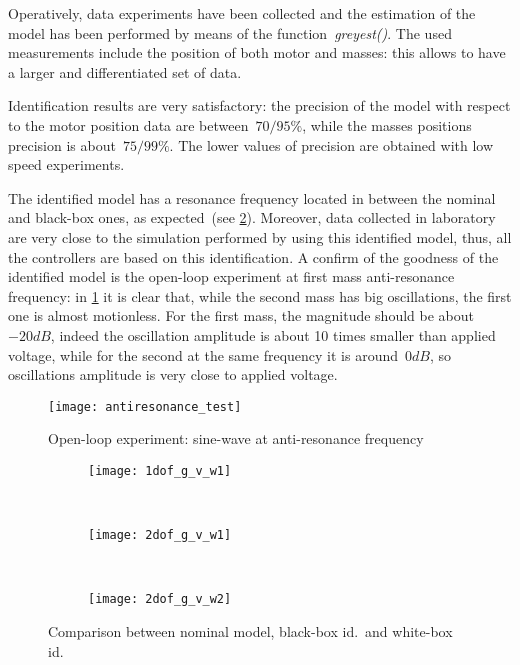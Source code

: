 Operatively, data experiments have been collected and the estimation of the model has been performed by means of the function~\textit{greyest()}. The used measurements include the position of both motor and masses: this allows to have a larger and differentiated set of data.

Identification results are very satisfactory: the precision of the model with respect to the motor position data are between~$70 / 95\%$, while the masses positions precision is about~$75 / 99\%$. The lower values of precision are obtained with low speed experiments.

The identified model has a resonance frequency located in between the nominal and black-box ones, as expected~(see \cref{fig:allModels_comparison}). Moreover, data collected in laboratory are very close to the simulation performed by using this identified model, thus, all the controllers are based on this identification. A confirm of the goodness of the identified model is the open-loop experiment at first mass anti-resonance frequency: in \cref{fig:antiresonance} it is clear that, while the second mass has big oscillations, the first one is almost motionless. For the first mass, the magnitude should be about~$-20 dB$, indeed the oscillation amplitude is about 10 times smaller than applied voltage, while for the second at the same frequency it is around~$0 dB$, so oscillations amplitude is very close to applied voltage.
\begin{figure}[h]
	\centering
	\texttt{[image: antiresonance\_test]}
	\caption{Open-loop experiment: sine-wave at anti-resonance frequency}
	\label{fig:antiresonance}
\end{figure}

\begin{figure}[b]
	\centering
	\begin{subfigure}{\columnwidth}
		\centering
		\texttt{[image: 1dof\_g\_v\_w1]}
	\end{subfigure}
	\\
	\begin{subfigure}{\columnwidth}
		\centering
		\texttt{[image: 2dof\_g\_v\_w1]}
	\end{subfigure}
	\\
	\begin{subfigure}{\columnwidth}
		\centering
		\texttt{[image: 2dof\_g\_v\_w2]}
	\end{subfigure}
	\caption{Comparison between nominal model, black-box id.\ and white-box id.}
	\label{fig:allModels_comparison}
\end{figure}

